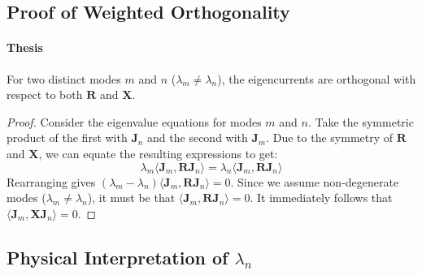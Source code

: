 \documentclass[11pt, a4paper]{report}
\begin{document}
\subsection{Proof of Weighted Orthogonality} \label{ssec:proof_ortho}
\paragraph{Thesis} For two distinct modes $m$ and $n$ ($\lambda_m \neq \lambda_n$), the eigencurrents are orthogonal with respect to both $\mathbf{R}$ and $\mathbf{X}$.
\begin{proof}
Consider the eigenvalue equations for modes $m$ and $n$. Take the symmetric product of the first with $\mathbf{J}_n$ and the second with $\mathbf{J}_m$. Due to the symmetry of $\mathbf{R}$ and $\mathbf{X}$, we can equate the resulting expressions to get:
\begin{equation}
    \lambda_m \langle \mathbf{J}_m, \mathbf{R}\mathbf{J}_n \rangle = \lambda_n \langle \mathbf{J}_m, \mathbf{R}\mathbf{J}_n \rangle
\end{equation}
Rearranging gives $(\lambda_m - \lambda_n) \langle \mathbf{J}_m, \mathbf{R}\mathbf{J}_n \rangle = 0$. Since we assume non-degenerate modes ($\lambda_m \neq \lambda_n$), it must be that $\langle \mathbf{J}_m, \mathbf{R}\mathbf{J}_n \rangle = 0$. It immediately follows that $\langle \mathbf{J}_m, \mathbf{X}\mathbf{J}_n \rangle = 0$.
\end{proof}

\subsection{Physical Interpretation of $\lambda_n$} \label{ssec:proof_phys}
\end{document}
